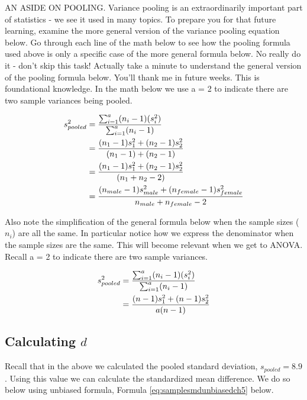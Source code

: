 \documentclass[
]{krantz}
\makeatletter
\newenvironment{kframe}{%
\medskip{}
\setlength{\fboxsep}{.8em}
 \def\at@end@of@kframe{}%
 \ifinner\ifhmode%
  \def\at@end@of@kframe{\end{minipage}}%
  \begin{minipage}{\columnwidth}%
 \fi\fi%
 \def\FrameCommand##1{\hskip\@totalleftmargin \hskip-\fboxsep
 \colorbox{shadecolor}{##1}\hskip-\fboxsep
     \hskip-\linewidth \hskip-\@totalleftmargin \hskip\columnwidth}%
 \MakeFramed {\advance\hsize-\width
   \@totalleftmargin\z@ \linewidth\hsize
   \@setminipage}}%
 {\par\unskip\endMakeFramed%
 \at@end@of@kframe}
\newenvironment{rmdblock}[1]
  {
  \begin{itemize}
  \renewcommand{\labelitemi}{
    \raisebox{-.7\height}[0pt][0pt]{
      {\setkeys{Gin}{width=3em,keepaspectratio}\texttt{[image: images/\#1]}}
    }
  }
  \setlength{\fboxsep}{1em}
  \begin{kframe}
  \item
  }
  {
  \end{kframe}
  \end{itemize}
  }
\newenvironment{rmdcaution}
  {\begin{rmdblock}{caution}}
  {\end{rmdblock}}
\makeatother
\begin{document}
\begin{rmdcaution}
AN ASIDE ON POOLING. Variance pooling is an extraordinarily important part of statistics - we see it used in many topics. To prepare you for that future learning, examine the more general version of the variance pooling equation below. Go through each line of the math below to see how the pooling formula used above is only a specific case of the more general formula below. No really do it - don't skip this task! Actually take a minute to understand the general version of the pooling formula below. You'll thank me in future weeks. This is foundational knowledge.
In the math below we use a = 2 to indicate there are two sample variances being pooled.

\[
\begin{aligned}
s_{pooled}^2 &= \frac{\sum_{i=1}^{a}(n_i-1)(s_i^2)}{\sum_{i=1}^{a}(n_i-1)} \\
&= \frac{(n_1-1)s_1^2 + (n_2 -1)s_2^2}{(n_1-1)+(n_2-1)} \\
&= \frac{(n_1-1)s_1^2 + (n_2 -1)s_2^2}{(n_1+n_2-2)} \\
&= \frac{(n_{male} -1)s_{male}^2 + (n_{female} -1)s_{female}^2}{n_{male} + n_{female}-2} \\
\end{aligned}\\
\]

Also note the simplification of the general formula below when the sample sizes (\(n_i\)) are all the same. In particular notice how we express the denominator when the sample sizes are the same. This will become relevant when we get to ANOVA. Recall a = 2 to indicate there are two sample variances.

\[
\begin{aligned}
s_{pooled}^2 &= \frac{\sum_{i=1}^{a}(n_i-1)(s_i^2)}{\sum_{i=1}^{a}(n_i-1)} \\
&= \frac{(n-1)s_1^2 + (n-1)s_2^2}{a(n-1)} \\
\end{aligned}\\
\]
\end{rmdcaution}

\hypertarget{calculating-d}{%
\subsection{\texorpdfstring{Calculating \(d\)}{Calculating d}}\label{calculating-d}}

Recall that in the above we calculated the pooled standard deviation, \(s_{pooled} = 8.9\). Using this value we can calculate the standardized mean difference. We do so below using unbiased formula, Formula \eqref{eq:samplesmdunbiasedch5} below.
\end{document}
